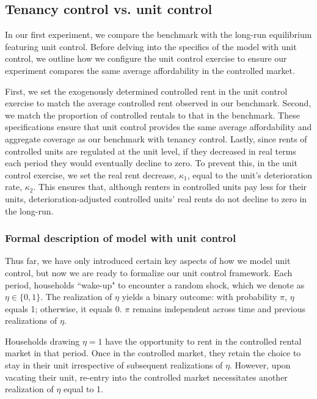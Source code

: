 \documentclass[parskip=full]{article}
\begin{document}
\subsection{Tenancy control vs. unit control}\label{sec:unit_control_comparison}

In our first experiment, we compare the benchmark with the long-run equilibrium featuring unit control. Before delving into the specifics of the model with unit control, we outline how we configure the unit control exercise to ensure our experiment compares the same average affordability in the controlled market.

First, we set the exogenously determined controlled rent in the unit control exercise to match the average controlled rent observed in our benchmark. Second, we match the proportion of controlled rentals to that in the benchmark. These specifications ensure that unit control provides the same average affordability and aggregate coverage as our benchmark with tenancy control. Lastly, since rents of controlled units are regulated at the unit level, if they decreased in real terms each period they would eventually decline to zero. To prevent this, in the unit control exercise, we set the real rent decrease, $\kappa_1$, equal to the unit’s deterioration rate, $\kappa_2$. This ensures that, although renters in controlled units pay less for their units, deterioration-adjusted controlled units' real rents do not decline to zero in the long-run.

\subsubsection{Formal description of model with unit control}

Thus far, we have only introduced certain key aspects of how we model unit control, but now we are ready to formalize our unit control framework. Each period, households ``wake-up" to encounter a random shock, which we denote as $\eta \in \{0,1\}$. The realization of $\eta$ yields a binary outcome: with probability $\pi$, $\eta$ equals 1; otherwise, it equals 0. $\pi$ remains independent across time and previous realizations of $\eta$.

Households drawing $\eta = 1$ have the opportunity to rent in the controlled rental market in that period. Once in the controlled market, they retain the choice to stay in their unit irrespective of subsequent realizations of $\eta$. However, upon vacating their unit, re-entry into the controlled market necessitates another realization of $\eta$ equal to 1. 
\end{document}
